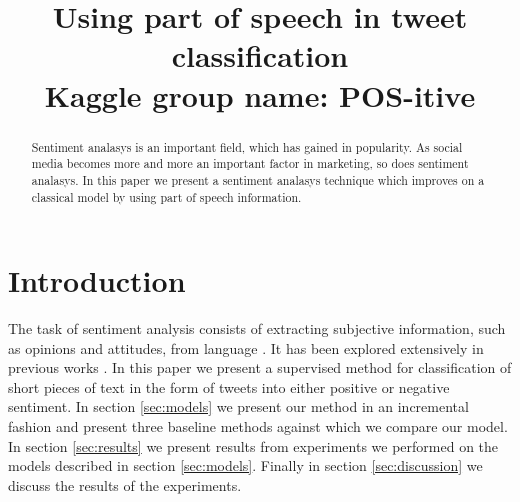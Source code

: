 \documentclass[conference]{IEEEtran}
\title{Using part of speech in tweet classification\\
\normalsize Kaggle group name: POS-itive}
\author{\IEEEauthorblockN{Richard Wigren}
		\IEEEauthorblockN{17-909-383} 
		\and 
		\IEEEauthorblockN{Michiel Baptist}
		\IEEEauthorblockN{17-907-544} 
		\and 
		\IEEEauthorblockN{Gorm Rødder}
		\IEEEauthorblockN{17-908-963}}
\begin{document}
	\maketitle
	
\begin{abstract}
 Sentiment analasys is an important field, which has gained in popularity. As social media becomes more and more an important factor in marketing, so does sentiment analasys. In this paper we present a sentiment analasys technique which improves on a classical model by using part of speech information. 
\end{abstract}
	
\section{Introduction} The task of sentiment analysis consists of extracting subjective information, such as opinions and attitudes, from language \cite{Liu10sentimentanalysis}. It has been explored extensively in previous works \cite{Liu10sentimentanalysis,SA_RECENT}. In this paper we present a supervised method for classification of short pieces of text in the form of tweets into either positive or negative sentiment. In section \ref{sec:models} we present our method in an incremental fashion and present three baseline methods against which we compare our model. In section \ref{sec:results} we present results from experiments we performed on the models described in section \ref{sec:models}. Finally in section \ref{sec:discussion} we discuss the results of the experiments.
	
\end{document}
